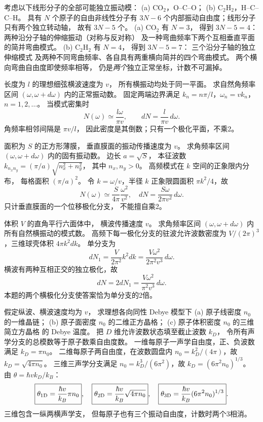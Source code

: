 考虑以下线形分子的全部可能独立振动模：
(a) $\mathrm{CO_2}$，O--C--O；
(b) $\mathrm{C_2H_2}$，H--C--C--H。
\exsolution
具有 $N$ 个原子的自由非线性分子有 $3N-6$
个内部振动自由度；线形分子只有两个独立转动轴，
故有 $3N-5$ 个。
(a) $\mathrm{CO_2}$ 有 $N=3$，
得到 $\boxed{3N-5=4}$：
两种沿分子轴的伸缩振动（对称与反对称）
及一种弯曲频率下两个互相垂直平面的简并弯曲模式。
(b) $\mathrm{C_2H_2}$ 有 $N=4$，
得到 $\boxed{3N-5=7}$：
三个沿分子轴的独立伸缩模式
及两种不同弯曲频率、各自具有两重横向简并的四个弯曲模式。
\excheck 两个横向弯曲自由度即使频率相等，
仍是\emph{两个}独立正常坐标，计数不可漏掉。

长度为 $l$ 的理想细弦横波速度为 $v$，
所有横振动均处于同一平面。
求自然角频率区间 $(\omega,\omega+d\omega)$
内的正常振动数。
\exsolution
固定两端边界满足
$k_n=n\pi/l$，$\omega_n=vk_n$，
$n=1,2,\ldots$。
当模式密集时
\[
 N(\omega)\simeq\frac{l\omega}{\pi v},\qquad
 \boxed{dN=\frac l{\pi v}\,d\omega}.
\]
\excheck 角频率相邻间隔是 $\pi v/l$，
因此密度是其倒数；只有一个极化平面，不乘2。

面积为 $S$ 的正方形薄膜，
垂直膜面的振动传播速度为 $v$。
求角频率区间 $(\omega,\omega+d\omega)$
内的固有振动数。
\exsolution
边长 $a=\sqrt S$，
本征波数
$k_{n_xn_y}=(\pi/a)\sqrt{n_x^2+n_y^2}$，
其中 $n_x,n_y>0$。
高频模式在 $k$ 空间的正象限内分布，
每格面积 $(\pi/a)^2$。
令 $k=\omega/v$，半径 $k$ 正象限圆面积
$\pi k^2/4$，故
\[
 N(\omega)\simeq
 \frac{S}{4\pi}\frac{\omega^2}{v^2},\quad
 \boxed{dN=\frac{S\omega}{2\pi v^2}\,d\omega}.
\]
\excheck 只计垂直膜面的一个位移极化分支，
不能擅自乘2。

体积 $V$ 的直角平行六面体中，
横波传播速度 $v$。
求角频率区间 $(\omega,\omega+d\omega)$
内所有自然横振动的模式数。
\exsolution
高频下每一极化分支的驻波允许波数密度为
$V/(2\pi)^3$，三维球壳体积 $4\pi k^2dk$。
单分支为
\[
 dN_1=\frac{V}{2\pi^2}k^2dk
 =\frac{V\omega^2}{2\pi^2v^3}\,d\omega.
\]
横波有两种互相正交的独立极化，故
\[
 \boxed{dN=2dN_1=
 \frac{V\omega^2}{\pi^2v^3}\,d\omega}.
\]
\excheck 本题的两个横极化分支使答案恰为单分支的2倍。

假定纵波、横波速度均为 $v$，
求理想各向同性 Debye 模型下
(a) 原子线密度 $n_0$ 的一维晶链；
(b) 原子面密度 $n_0$ 的二维正方晶格；
(c) 原子体积密度 $n_0$ 的三维简立方晶格
的 Debye 温度。
\exsolution
把 $D$ 维允许波数状态填至截止波数 $k_D$，
令所有声学分支的总模数等于原子数乘自由度数。
一维每原子一声学自由度，正、负波数满足
$k_D=\pi n_0$。
二维每原子两自由度，在波数圆盘内
$n_0=k_D^2/(4\pi)$，故 $k_D=\sqrt{4\pi n_0}$。
三维三声学分支满足
$n_0=k_D^3/(6\pi^2)$，故
$k_D=(6\pi^2n_0)^{1/3}$。
由 $\theta=\hbar vk_D/k_B$：
\[
 \boxed{\theta_{\rm1D}=\frac{\hbar v}{k_B}\pi n_0},\quad
 \boxed{\theta_{\rm2D}=\frac{\hbar v}{k_B}\sqrt{4\pi n_0}},\quad
 \boxed{\theta_{\rm3D}=\frac{\hbar v}{k_B}(6\pi^2n_0)^{1/3}}.
\]
\excheck 三维包含一纵两横声学支，
但每原子也有三个振动自由度，计数时两个3相消。

